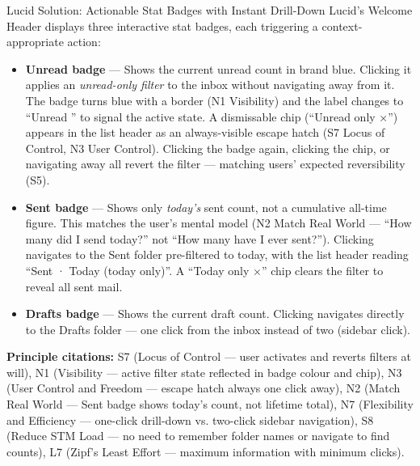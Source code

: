 \documentclass[12pt,a4paper]{report}
\begin{document}
\begin{lucidSolutionBox}{Lucid Solution: Actionable Stat Badges with Instant Drill-Down}
  Lucid's Welcome Header displays three interactive stat badges, each triggering
  a context-appropriate action:

  \begin{itemize}[leftmargin=*, itemsep=4pt]
    \item \textbf{Unread badge} — Shows the current unread count in brand blue.
          Clicking it applies an \textit{unread-only filter} to the inbox without
          navigating away from it. The badge turns blue with a border (N1 Visibility)
          and the label changes to ``Unread \texttimes'' to signal the active state.
          A dismissable chip (``Unread only ×'') appears in the list header as an
          always-visible escape hatch (S7 Locus of Control, N3 User Control).
          Clicking the badge again, clicking the chip, or navigating away all
          revert the filter — matching users' expected reversibility (S5).

    \item \textbf{Sent badge} — Shows only \textit{today's} sent count, not a
          cumulative all-time figure. This matches the user's mental model
          (N2 Match Real World — ``How many did I send today?'' not ``How many
          have I ever sent?''). Clicking navigates to the Sent folder pre-filtered
          to today, with the list header reading ``Sent · Today (today only)''.
          A ``Today only ×'' chip clears the filter to reveal all sent mail.

    \item \textbf{Drafts badge} — Shows the current draft count. Clicking navigates
          directly to the Drafts folder — one click from the inbox instead of two
          (sidebar click).
  \end{itemize}
\end{lucidSolutionBox}

\textbf{Principle citations:} S7 (Locus of Control — user activates and reverts
filters at will), N1 (Visibility — active filter state reflected in badge colour
and chip), N3 (User Control and Freedom — escape hatch always one click away),
N2 (Match Real World — Sent badge shows today's count, not lifetime total),
N7 (Flexibility and Efficiency — one-click drill-down vs. two-click sidebar navigation),
S8 (Reduce STM Load — no need to remember folder names or navigate to find counts),
L7 (Zipf's Least Effort — maximum information with minimum clicks).
\end{document}
